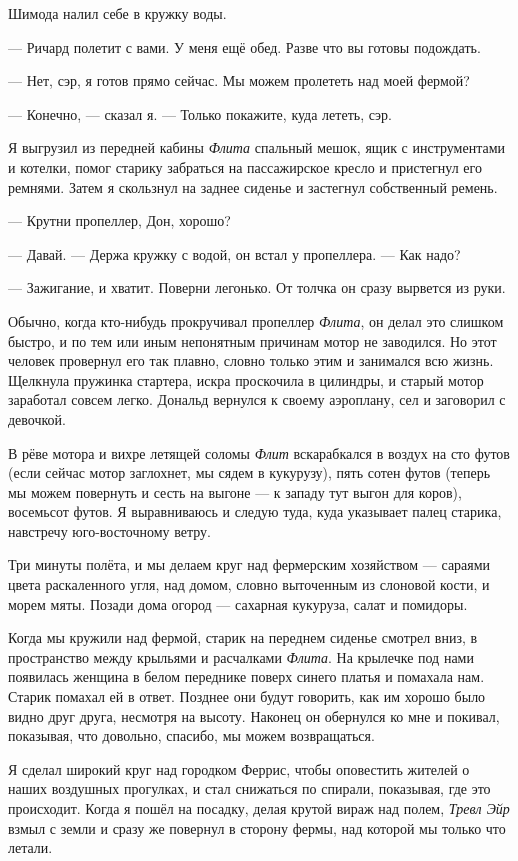 Шимода налил себе в кружку воды.

--- Ричард полетит с вами. У меня ещё обед. Разве что вы готовы подождать.

--- Нет, сэр, я готов прямо сейчас. Мы можем пролететь над моей фермой?

--- Конечно, --- сказал я. --- Только покажите, куда лететь, сэр.

Я выгрузил из передней кабины {\it Флита\/} спальный мешок, ящик с инструментами и котелки, помог старику забраться на пассажирское кресло и пристегнул его ремнями. Затем я скользнул на заднее сиденье и застегнул собственный ремень.

--- Крутни пропеллер, Дон, хорошо?

--- Давай. --- Держа кружку с водой, он встал у пропеллера. --- Как надо?

--- Зажигание, и хватит. Поверни легонько. От толчка он сразу вырвется из руки.

Обычно, когда кто-нибудь прокручивал пропеллер {\it Флита}, он делал это слишком быстро, и по тем или иным непонятным причинам мотор не заводился. Но этот человек провернул его так плавно, словно только этим и занимался всю жизнь. Щелкнула пружинка стартера, искра проскочила в цилиндры, и старый мотор заработал совсем легко. Дональд вернулся к своему аэроплану, сел и заговорил с девочкой.

В рёве мотора и вихре летящей соломы {\it Флит\/} вскарабкался в воздух на сто футов (если сейчас мотор заглохнет, мы сядем в кукурузу), пять сотен футов (теперь мы можем повернуть и сесть на выгоне --- к западу тут выгон для коров), восемьсот футов. Я выравниваюсь и следую туда, куда указывает палец старика, навстречу юго-восточному ветру.

Три минуты полёта, и мы делаем круг над фермерским хозяйством --- сараями цвета раскаленного угля, над домом, словно выточенным из слоновой кости, и морем мяты. Позади дома огород --- сахарная кукуруза, салат и помидоры.

Когда мы кружили над фермой, старик на переднем сиденье смотрел вниз, в пространство между
крыльями и расчалками {\it Флита}. На крылечке под нами появилась женщина в белом переднике поверх
синего платья и помахала нам. Старик помахал ей в ответ. Позднее они будут говорить, как им хорошо
было видно друг друга, несмотря на высоту. Наконец он обернулся ко мне и покивал, показывая, что
довольно, спасибо, мы можем возвращаться.

Я сделал широкий круг над городком Феррис, чтобы оповестить жителей о наших воздушных прогулках,
и стал снижаться по спирали, показывая, где это происходит. Когда я пошёл на посадку, делая крутой
вираж над полем, {\it Тревл Эйр\/} взмыл с земли и сразу же повернул в сторону фермы, над которой мы только что летали.

